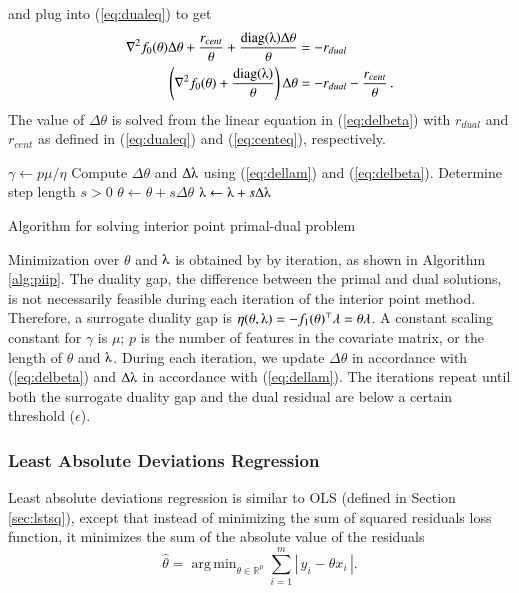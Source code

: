 \documentclass[11pt]{article}
\DeclareMathOperator*{\argmin}{arg\,min}
\begin{document}
and plug into (\ref{eq:dualeq}) to get
\begin{align}
\nabla^2f_0(\theta)\Delta\theta +\frac{r_{cent}}{\theta} + \frac{\text{diag}(\lambdaup)\Delta\theta}{\theta} &= -r_{dual}\nonumber\\ 
\left(\nabla^2f_0(\theta) + \frac{\text{diag}(\lambdaup)}{\theta}\right)\Delta\theta &= -r_{dual} - \frac{r_{cent}}{\theta}\,.\label{eq:delbeta}
\end{align}
The value of $\Delta\theta$ is solved from the linear equation in (\ref{eq:delbeta}) with $r_{dual}$ and $r_{cent}$ as defined in (\ref{eq:dualeq}) and (\ref{eq:centeq}), respectively.

\begin{algorithm}\begingroup\fontsize{10}{10}\selectfont
\begin{algorithmic}
\State
{}
	\State $\gamma \gets p\mu/\eta$
	\State Compute $\Delta\theta$ and $\Delta\lambdaup$ using (\ref{eq:dellam}) and (\ref{eq:delbeta}).
	\State Determine step length $s>0$
	\State $\theta \gets \theta + s\Delta\theta$
	\State $\lambdaup \gets \lambdaup + s\Delta\lambdaup$
\EndWhile
\end{algorithmic}\endgroup\caption{Algorithm for solving interior point primal-dual problem}\label{alg:piip}
\end{algorithm} 

Minimization over $\theta$ and $\lambdaup$ is obtained by by iteration, as shown in Algorithm \ref{alg:piip}. The duality gap, the difference between the primal and dual solutions, is not necessarily feasible during each iteration of the interior point method. Therefore, a surrogate duality gap is $\eta(\theta, \lambdaup) = -f_1(\theta)^\top\lambda = \theta\lambda$. A constant scaling constant for $\gamma$ is $\mu$; $p$ is the number of features in the covariate matrix, or the length of $\theta$ and $\lambdaup$. During each iteration, we update $\Delta\theta$ in accordance with (\ref{eq:delbeta}) and $\Delta\lambdaup$ in accordance with (\ref{eq:dellam}). The iterations repeat until both the surrogate duality gap and the dual residual are below a certain threshold ($\epsilon$).

\subsubsection{Least Absolute Deviations Regression} \label{sec:lad}

Least absolute deviations regression is similar to OLS (defined in Section \ref{sec:lstsq}), except that instead of minimizing the sum of squared residuals loss function, it minimizes the sum of the absolute value of the residuals
\[\hat{\theta} = \argmin_{\theta\in\mathbb{R}^p}\sum_{i=1}^m \left|\,y_i - \theta x_i\,\right|.\]
\end{document}
